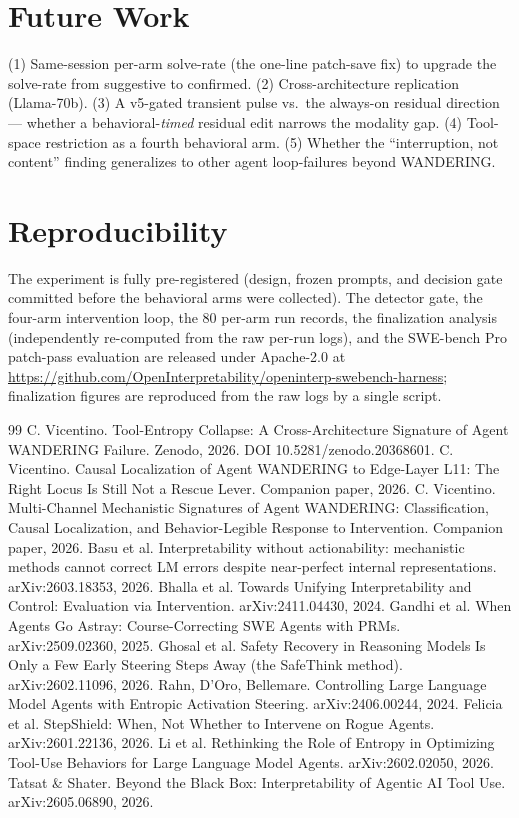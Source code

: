 \documentclass[11pt]{article}
\begin{document}
\section*{Future Work}
(1) Same-session per-arm solve-rate (the one-line patch-save fix) to upgrade the solve-rate from suggestive to confirmed. (2) Cross-architecture replication (Llama-70b). (3) A v5-gated transient pulse vs.\ the always-on residual direction --- whether a behavioral-\emph{timed} residual edit narrows the modality gap. (4) Tool-space restriction as a fourth behavioral arm. (5) Whether the ``interruption, not content'' finding generalizes to other agent loop-failures beyond WANDERING.

\section*{Reproducibility}
The experiment is fully pre-registered (design, frozen prompts, and decision gate committed before the behavioral arms were collected). The detector gate, the four-arm intervention loop, the 80 per-arm run records, the finalization analysis (independently re-computed from the raw per-run logs), and the SWE-bench Pro patch-pass evaluation are released under Apache-2.0 at \url{https://github.com/OpenInterpretability/openinterp-swebench-harness}; finalization figures are reproduced from the raw logs by a single script.

\begin{thebibliography}{99}
 C. Vicentino. Tool-Entropy Collapse: A Cross-Architecture Signature of Agent WANDERING Failure. Zenodo, 2026. DOI 10.5281/zenodo.20368601.
 C. Vicentino. Causal Localization of Agent WANDERING to Edge-Layer L11: The Right Locus Is Still Not a Rescue Lever. Companion paper, 2026.
 C. Vicentino. Multi-Channel Mechanistic Signatures of Agent WANDERING: Classification, Causal Localization, and Behavior-Legible Response to Intervention. Companion paper, 2026.
 Basu et al. Interpretability without actionability: mechanistic methods cannot correct LM errors despite near-perfect internal representations. arXiv:2603.18353, 2026.
 Bhalla et al. Towards Unifying Interpretability and Control: Evaluation via Intervention. arXiv:2411.04430, 2024.
 Gandhi et al. When Agents Go Astray: Course-Correcting SWE Agents with PRMs. arXiv:2509.02360, 2025.
 Ghosal et al. Safety Recovery in Reasoning Models Is Only a Few Early Steering Steps Away (the SafeThink method). arXiv:2602.11096, 2026.
 Rahn, D'Oro, Bellemare. Controlling Large Language Model Agents with Entropic Activation Steering. arXiv:2406.00244, 2024.
 Felicia et al. StepShield: When, Not Whether to Intervene on Rogue Agents. arXiv:2601.22136, 2026.
 Li et al. Rethinking the Role of Entropy in Optimizing Tool-Use Behaviors for Large Language Model Agents. arXiv:2602.02050, 2026.
 Tatsat \& Shater. Beyond the Black Box: Interpretability of Agentic AI Tool Use. arXiv:2605.06890, 2026.
\end{thebibliography}
\end{document}
